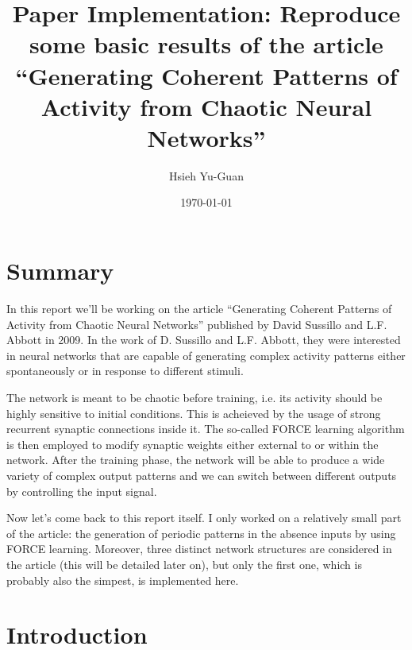 

\pagestyle{fancy} 
\rhead{}
\rfoot{\thepage}
\cfoot{}
\lfoot{~\theauthor}
\renewcommand{\headrulewidth}{0.4pt}
\renewcommand{\footrulewidth}{0.4pt}


\title{Paper Implementation: Reproduce some basic results
of the article ``Generating Coherent Patterns of Activity from
Chaotic Neural Networks''\vspace{-0.5em}}
\author{Hsieh Yu-Guan}
\date{\today}
\maketitle

\thispagestyle{fancy}

\setcounter{secnumdepth}{0}

\section{Summary}

In this report we'll be working on the article ``Generating Coherent
Patterns of Activity from Chaotic Neural Networks'' published by 
David Sussillo and L.F. Abbott in 2009. In the work of D. Sussillo and L.F.
Abbott, they were interested in neural networks that are capable of
generating complex activity patterns either spontaneously or in response to
different stimuli.

The network is meant to be chaotic before training, i.e.
its activity should be highly sensitive to initial conditions. This is
acheieved by the usage of strong recurrent synaptic connections inside it. 
The so-called FORCE learning algorithm is then employed to modify
synaptic weights either external to or within the network. 
After the training phase, the network will be able to produce a wide 
variety of complex output patterns and we can switch between different
outputs by controlling the input signal.

Now let's come back to this report itself. I only worked on a relatively 
small part of the article: the generation of periodic patterns in the 
absence inputs by using FORCE learning. Moreover, three distinct network
structures are considered in the article (this will be detailed later on), 
but only the first one, which is probably also the simpest, is implemented 
here.

\section{Introduction}

